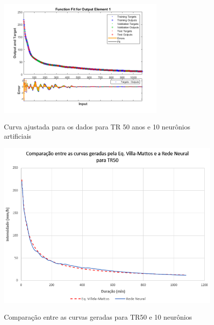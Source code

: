 \begin{figure}[H]
    \caption{Curva ajustada para os dados para TR 50 anos e 10 neurônios artificiais}
    \centering
    \includegraphics[width=0.74\textwidth]{Textuais/Figuras/NN/tr50-10neuronio.png}
    \label{fig:tr50-10n}
\end{figure}

\begin{figure}[H]
    \caption{Comparação entre as curvas geradas para TR50 e 10 neurônios}
    \centering
    \includegraphics[width=\textwidth]{Textuais/Resultados/Comparacao/TR50.png}
    \label{fig:comp-tr50}
\end{figure}